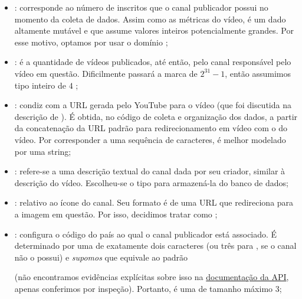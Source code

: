 \begin{itemize}
    \item {}: corresponde ao número de inscritos que o canal publicador possui no momento da coleta de dados. Assim como as métricas do vídeo, é um dado altamente mutável e que assume valores inteiros potencialmente grandes. Por esse motivo, optamos por usar o domínio ;
    \item {}: é a quantidade de vídeos publicados, até então, pelo canal responsável pelo vídeo em questão. Dificilmente passará a marca de $2^{31} - 1$, então assumimos tipo inteiro de $4$ ;
    \item {}: condiz com a URL gerada pelo YouTube para o vídeo (que foi discutida na descrição de ). É obtida, no código de coleta e organização dos dados, a partir da concatenação da URL padrão para redirecionamento em vídeo com o  do vídeo. Por corresponder a uma sequência de caracteres, é melhor modelado por uma string;
    \item {}: refere-se a uma descrição textual do canal dada por seu criador, similar à descrição do vídeo. Escolheu-se o tipo  para armazená-la do banco de dados;
    \item {}: relativo ao ícone do canal. Seu formato é de uma URL que redireciona para a imagem em questão. Por isso, decidimos tratar como ;
    \item {}: configura o código do país ao qual o canal publicador está associado. É determinado por uma  de exatamente dois caracteres (ou três para , se o canal não o possui) e \emph{supomos} que equivale ao padrão \href{https://www.iso.org/iso-3166-country-codes.html}{}\cite{iso-3166}

    (não encontramos evidências explícitas sobre isso na \href{https://developers.google.com/youtube/v3/docs/channels?hl=pt-br#snippet.country}{documentação da API}, apenas conferimos por inspeção). Portanto, é uma  de tamanho máximo 3;


\end{itemize}
